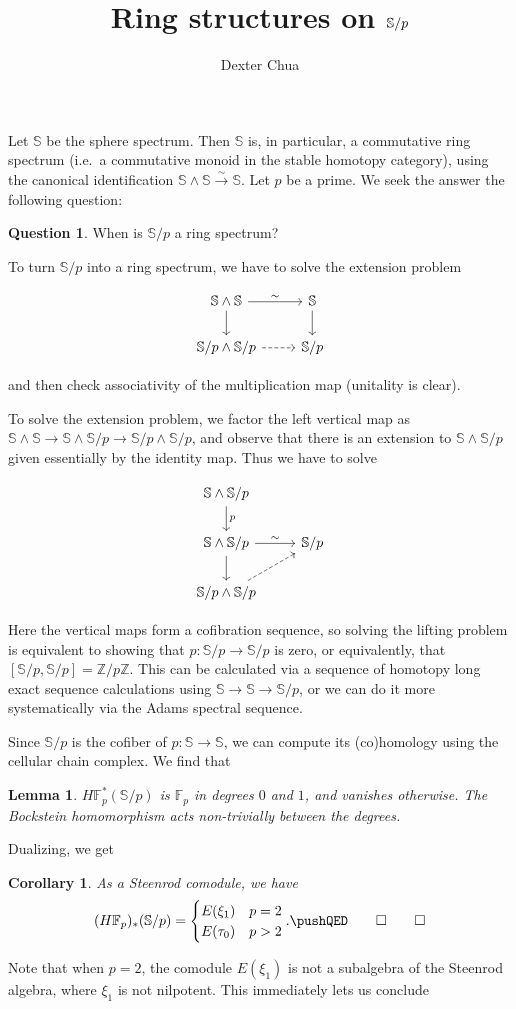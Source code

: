 \documentclass{shortart}
\title{Ring structures on \texorpdfstring{$\S/p$}{S/p}}
\author{Dexter Chua}
\newtheorem*{lemma}{Lemma}
\newtheorem*{cor}{Corollary}
\theoremstyle{definition}
\newtheorem*{ques}{Question}
\renewcommand\S{\mathbb{S}}
\newcommand\F{\mathbb{F}}
\newcommand\Z{\mathbb{Z}}
\begin{document}
Let $\S$ be the sphere spectrum. Then $\S$ is, in particular, a commutative ring spectrum (i.e.\ a commutative monoid in the stable homotopy category), using the canonical identification $\S \wedge \S \overset{\sim}{\to} \S$. Let $p$ be a prime. We seek the answer the following question:
\begin{ques}
  When is $\S/p$ a ring spectrum?
\end{ques}

To turn $\S/p$ into a ring spectrum, we have to solve the extension problem
\begin{useimager}
\[
  \begin{tikzcd}
    \S \wedge \S \ar[r, "\sim"] \ar[d] & \S \ar[d]\\
    \S/p \wedge \S/p \ar[r, dashed] & \S/p
  \end{tikzcd}
\]
\end{useimager}
and then check associativity of the multiplication map (unitality is clear).

To solve the extension problem, we factor the left vertical map as $\S \wedge \S \to \S \wedge \S/p \to \S/p \wedge \S/p$, and observe that there is an extension to $\S \wedge \S/p$ given essentially by the identity map. Thus we have to solve
\begin{useimager}
\[
  \begin{tikzcd}
    \S \wedge \S/p \ar[d, "p"] \\
    \S \wedge \S/p \ar[r, "\sim"] \ar[d] & \S/p\\
    \S/p \wedge \S/p \ar[ur, dashed]
  \end{tikzcd}
\]
\end{useimager}
Here the vertical maps form a cofibration sequence, so solving the lifting problem is equivalent to showing that $p: \S/p \to \S/p$ is zero, or equivalently, that $[\S/p, \S/p] = \Z/p\Z$. This can be calculated via a sequence of homotopy long exact sequence calculations using $\S \to \S \to \S/p$, or we can do it more systematically via the Adams spectral sequence.

Since $\S/p$ is the cofiber of $p: \S \to \S$, we can compute its (co)homology using the cellular chain complex. We find that
\begin{lemma}
  $H\F_p^*(\S/p)$ is $\F_p$ in degrees $0$ and $1$, and vanishes otherwise. The Bockstein homomorphism acts non-trivially between the degrees.\fakeqed
\end{lemma}

Dualizing, we get
\begin{cor}
  As a Steenrod comodule, we have
  \[
    (H\F_p)_*(\S/p) =
    \begin{cases}
      E(\xi_1) & p = 2\\
      E(\tau_0) & p > 2
    \end{cases}.\fakeqed
  \]\ifplastex\fakeqed\fi
\end{cor}
Note that when $p = 2$, the comodule $E(\xi_1)$ is not a subalgebra of the Steenrod algebra, where $\xi_1$ is not nilpotent. This immediately lets us conclude
\end{document}

